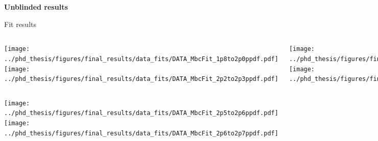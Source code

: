 \documentclass[xcolor=dvipsnames]{beamer}
\begin{document}

\addtocounter{framenumber}{-1}
{ 
\begin{frame}
   \centering
   \textbf{Unblinded results}
\end{frame}
}

\begin{frame}{Fit results}
\begin{columns}
   \centering
   \texttt{[image: ../phd\_thesis/figures/final\_results/data\_fits/DATA\_MbcFit\_1p8to2p0ppdf.pdf]}
   \texttt{[image: ../phd\_thesis/figures/final\_results/data\_fits/DATA\_MbcFit\_2p2to2p3ppdf.pdf]}

   \centering
   \texttt{[image: ../phd\_thesis/figures/final\_results/data\_fits/DATA\_MbcFit\_2p0to2p1ppdf.pdf]}
   \texttt{[image: ../phd\_thesis/figures/final\_results/data\_fits/DATA\_MbcFit\_2p3to2p4ppdf.pdf]}

   \centering
   \texttt{[image: ../phd\_thesis/figures/final\_results/data\_fits/DATA\_MbcFit\_2p1to2p2ppdf.pdf]}
   \texttt{[image: ../phd\_thesis/figures/final\_results/data\_fits/DATA\_MbcFit\_2p4to2p5ppdf.pdf]}
\end{columns}
\begin{columns}
   \centering
   \texttt{[image: ../phd\_thesis/figures/final\_results/data\_fits/DATA\_MbcFit\_2p5to2p6ppdf.pdf]}
   \centering
   \texttt{[image: ../phd\_thesis/figures/final\_results/data\_fits/DATA\_MbcFit\_2p6to2p7ppdf.pdf]}

\end{columns}
\end{frame}
\end{document}
